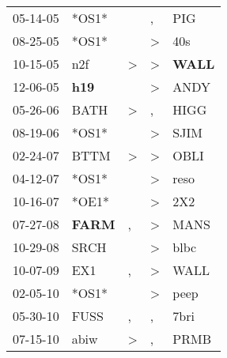 \begin{supertabular}{p{0.07\textwidth}p{0.06\textwidth}p{0.02\textwidth}p{0.02\textwidth}p{0.06\textwidth}}
          05-14-05\textsuperscript{} &                            *OS1* &               &                , &            PIG\textsuperscript{} \\
          08-25-05\textsuperscript{} &                            *OS1* &               &     \textgreater &            40s\textsuperscript{} \\
          10-15-05\textsuperscript{} &            n2f\textsuperscript{} &  \textgreater &     \textgreater &  \textbf{WALL\textsuperscript{}} \\
          12-06-05\textsuperscript{} &   \textbf{h19\textsuperscript{}} &               &     \textgreater &           ANDY\textsuperscript{} \\
          05-26-06\textsuperscript{} &           BATH\textsuperscript{} &  \textgreater &                , &           HIGG\textsuperscript{} \\
          08-19-06\textsuperscript{} &                            *OS1* &               &     \textgreater &           SJIM\textsuperscript{} \\
          02-24-07\textsuperscript{} &           BTTM\textsuperscript{} &  \textgreater &     \textgreater &           OBLI\textsuperscript{} \\
          04-12-07\textsuperscript{} &                            *OS1* &               &     \textgreater &           reso\textsuperscript{} \\
          10-16-07\textsuperscript{} &                            *OE1* &               &     \textgreater &            2X2\textsuperscript{} \\
          07-27-08\textsuperscript{} &  \textbf{FARM\textsuperscript{}} &             , &     \textgreater &           MANS\textsuperscript{} \\
          10-29-08\textsuperscript{} &           SRCH\textsuperscript{} &               &     \textgreater &           blbc\textsuperscript{} \\
          10-07-09\textsuperscript{} &            EX1\textsuperscript{} &             , &     \textgreater &           WALL\textsuperscript{} \\
          02-05-10\textsuperscript{} &                            *OS1* &               &     \textgreater &           peep\textsuperscript{} \\
          05-30-10\textsuperscript{} &           FUSS\textsuperscript{} &             , &                , &           7bri\textsuperscript{} \\
          07-15-10\textsuperscript{} &           abiw\textsuperscript{} &  \textgreater &                , &           PRMB\textsuperscript{} \\

\end{supertabular}

